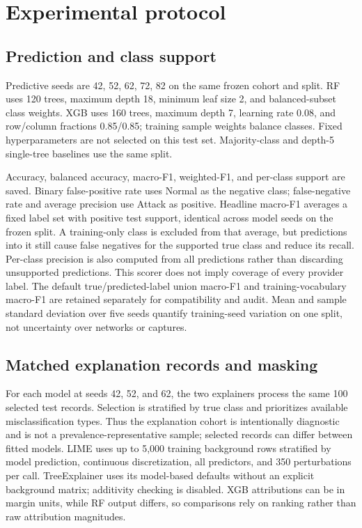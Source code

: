 \documentclass[journal,letterpaper]{IEEEtran}
\begin{document}
\section{Experimental protocol}
\subsection{Prediction and class support}
Predictive seeds are 42, 52, 62, 72, 82 on the same frozen cohort and split. RF uses 120 trees, maximum depth 18, minimum leaf size 2, and balanced-subset class weights. XGB uses 160 trees, maximum depth 7, learning rate 0.08, and row/column fractions 0.85/0.85; training sample weights balance classes. Fixed hyperparameters are not selected on this test set. Majority-class and depth-5 single-tree baselines use the same split.

Accuracy, balanced accuracy, macro-F1, weighted-F1, and per-class support are saved. Binary false-positive rate uses Normal as the negative class; false-negative rate and average precision use Attack as positive. Headline macro-F1 averages a fixed label set with positive test support, identical across model seeds on the frozen split. A training-only class is excluded from that average, but predictions into it still cause false negatives for the supported true class and reduce its recall. Per-class precision is also computed from all predictions rather than discarding unsupported predictions. This scorer does not imply coverage of every provider label. The default true/predicted-label union macro-F1 and training-vocabulary macro-F1 are retained separately for compatibility and audit. Mean and sample standard deviation over five seeds quantify training-seed variation on one split, not uncertainty over networks or captures.

\subsection{Matched explanation records and masking}
For each model at seeds 42, 52, and 62, the two explainers process the same 100 selected test records. Selection is stratified by true class and prioritizes available misclassification types. Thus the explanation cohort is intentionally diagnostic and is not a prevalence-representative sample; selected records can differ between fitted models. LIME uses up to 5,000 training background rows stratified by model prediction, continuous discretization, all predictors, and 350 perturbations per call. TreeExplainer uses its model-based defaults without an explicit background matrix; additivity checking is disabled. XGB attributions can be in margin units, while RF output differs, so comparisons rely on ranking rather than raw attribution magnitudes.
\end{document}
